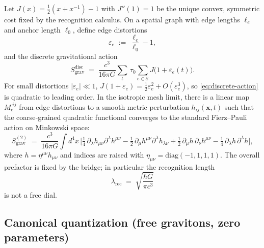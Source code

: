 \documentclass[11pt]{article}
\begin{document}
Let $J(x)=\tfrac12(x+x^{-1})-1$ with $J''(1)=1$ be the unique convex, symmetric cost fixed by the recognition calculus. On a spatial graph with edge lengths $\ell_e$ and anchor length $\ell_0$, define edge distortions
\[
\varepsilon_e \;:=\; \frac{\ell_e}{\ell_0}-1,
\]
and the discrete gravitational action
\begin{equation}
S_{\mathrm{grav}}^{\mathrm{disc}}
\;=\;
\frac{c^3}{16\pi G}\sum_{t}\,\tau_0
\sum_{e\in\mathcal{E}} J\!\big(1+\varepsilon_e(t)\big).
\label{eq:discrete-action}
\end{equation}
For small distortions $|\varepsilon_e|\ll 1$, $J(1+\varepsilon_e)=\tfrac12\varepsilon_e^2+O(\varepsilon_e^3)$, so \eqref{eq:discrete-action} is quadratic to leading order. In the isotropic mesh limit, there is a linear map $M_e^{\;ij}$ from edge distortions to a smooth metric perturbation $h_{ij}(\mathbf{x},t)$ such that the coarse‑grained quadratic functional converges to the standard Fierz–Pauli action on Minkowski space:
\begin{equation}
S_{\mathrm{grav}}^{(2)}
\;=\;
\frac{c^3}{16\pi G}\!\int\! d^4x\,
\Big[
\tfrac14\,\partial_\lambda h_{\mu\nu}\partial^{\lambda}h^{\mu\nu}
-\tfrac12\,\partial_\mu h^{\mu\nu}\partial^\lambda h_{\lambda\nu}
+\tfrac12\,\partial_\mu h\,\partial_\nu h^{\mu\nu}
-\tfrac14\,\partial_\lambda h\,\partial^\lambda h
\Big],
\label{eq:fierz-pauli}
\end{equation}
where $h=\eta^{\mu\nu}h_{\mu\nu}$ and indices are raised with $\eta_{\mu\nu}=\mathrm{diag}(-1,1,1,1)$. The overall prefactor is fixed by the bridge; in particular the recognition length
\begin{equation}
\lambda_{\mathrm{rec}} \;=\; \sqrt{\frac{\hbar G}{\pi c^3}}
\label{eq:lambda-rec}
\end{equation}
is not a free dial.

\subsection*{Canonical quantization (free gravitons, zero parameters)}
\end{document}
